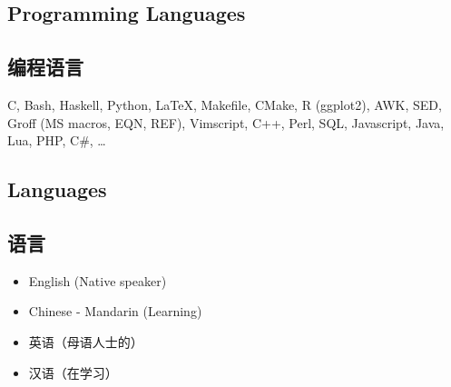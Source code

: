 \begin{xen}
\section{Programming Languages}
\end{xen}
\begin{xcn}
\section{编程语言}
\end{xcn}
    C,
    Bash,
    Haskell,
    Python,
    \LaTeX,
    Makefile,
    CMake,
    R (ggplot2),
    AWK,
    SED,
    Groff (MS macros, EQN, REF),
    Vimscript,
    C++,
    Perl,
    SQL,
    Javascript,
    Java,
    Lua,
    PHP,
    C\#,
    \ldots
\begin{xen}
\section{Languages}
\end{xen}
\begin{xcn}
\section{语言}
\end{xcn}
\begin{xen}
    \begin{itemize}
        \item English (Native speaker)
        \item Chinese - Mandarin (Learning)
    \end{itemize}
\end{xen}
\begin{xcn}
    \begin{itemize}
        \item 英语（母语人士的）
        \item 汉语（在学习）
    \end{itemize}
\end{xcn}
